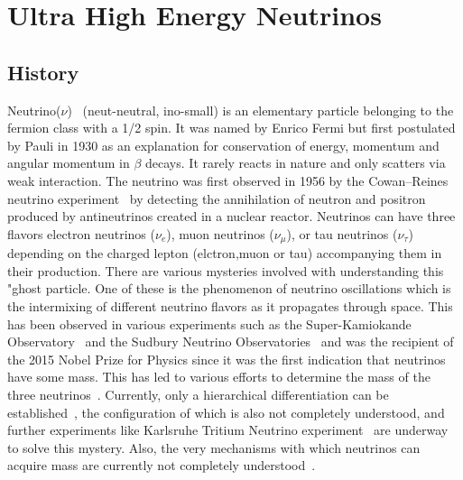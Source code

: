 \section{Ultra High Energy Neutrinos}
\label{sec:UHENu}
\subsection{History}
Neutrino($\nu$)~\cite{} (neut-neutral, ino-small) is an elementary particle belonging to the fermion class with a 1/2 spin. It was named by Enrico Fermi but first postulated by Pauli in 1930 as an explanation for conservation of energy, momentum and angular momentum in $\beta$ decays. It rarely reacts in nature and only scatters via weak interaction. The neutrino was first observed in 1956 by the Cowan–Reines neutrino experiment~\cite{} by detecting the annihilation of neutron and positron produced by antineutrinos created in a nuclear reactor. Neutrinos can have three flavors  electron neutrinos ($\nu_e$), muon neutrinos ($\nu_{\mu}$), or tau neutrinos ($\nu_{\tau}$) depending on the charged lepton (elctron,muon or tau) accompanying them in their production. There are various mysteries involved with understanding this "ghost particle. One of these is the phenomenon of neutrino oscillations which is the intermixing of different neutrino flavors as it propagates through space. This has been observed in various experiments such as the Super-Kamiokande Observatory~\cite{} and the Sudbury Neutrino Observatories~\cite{} and was the recipient of the 2015 Nobel Prize for Physics since it was the first indication that neutrinos have some mass. This has led to various efforts to determine the mass of the three neutrinos~\cite{}. Currently, only a hierarchical differentiation can be established~\cite{}, the configuration of which is also not completely understood, and further experiments like Karlsruhe Tritium Neutrino experiment~\cite{} are underway to solve this mystery. Also, the very mechanisms with which neutrinos can acquire mass are currently not completely understood~\cite{}. 
